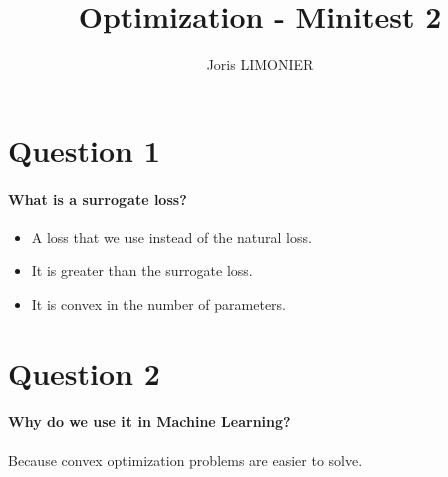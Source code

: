\documentclass{article}
\title{Optimization - Minitest 2}
\author{Joris LIMONIER}
\newcommand{\1}{\mathbf{1}}
\begin{document}
\maketitle
      
\section{Question 1}
\paragraph{What is a surrogate loss?}
\begin{itemize}
  \item A loss that we use instead of the natural loss.
  \item It is greater than the surrogate loss.
  \item It is convex in the number of parameters.
\end{itemize}

\section{Question 2}
\paragraph{Why do we use it in Machine Learning?}
Because convex optimization problems are easier to solve.
\end{document}
